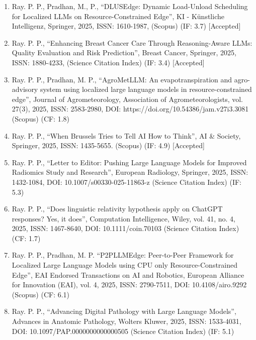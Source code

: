 \documentclass[11pt,a4paper]{moderncv}
\begin{document}
\begin{adjustwidth}{6em}{0pt}
	\begin{enumerate}
		
		
		\item Ray. P. P., Pradhan, M., P., “DLUSEdge: Dynamic Load-Unload Scheduling for Localized LLMs on Resource-Constrained Edge”, KI - Künstliche Intelligenz, Springer, 2025, ISSN: 1610-1987, (Scopus) (IF: 3.7) [Accepted]
		
		\item Ray. P. P., “Enhancing Breast Cancer Care Through Reasoning-Aware LLMs: Quality Evaluation and Risk Prediction”, Breast Cancer, Springer, 2025, ISSN: 1880-4233, (Science Citation Index) (IF: 3.4) [Accepted]
				
		\item Ray. P. P., Pradhan, M. P., “AgroMetLLM: An evapotranspiration and agro-advisory system using localized large language models in resource-constrained edge”, Journal of Agrometeorology, Association of Agrometeorologists, vol. 27(3), 2025, ISSN: 2583-2980, DOI: https://doi.org/10.54386/jam.v27i3.3081 (Scopus) (CF: 1.8)
		
		\item Ray. P. P., “When Brussels Tries to Tell AI How to Think”, AI \& Society, Springer, 2025, ISSN: 1435-5655. (Scopus) (IF: 4.9) [Accepted]
		
		\item Ray. P. P., “Letter to Editor: Pushing Large Language Models for Improved Radiomics Study and Research”, European Radiology, Springer, 2025, ISSN: 1432-1084, DOI: 10.1007/s00330-025-11863-z (Science Citation Index) (IF: 5.3)
		
		\item Ray. P. P., “Does linguistic relativity hypothesis apply on ChatGPT responses? Yes, it does”, Computation Intelligence, Wiley, vol. 41, no. 4, 2025, ISSN: 1467-8640, DOI: 10.1111/coin.70103 (Science Citation Index) (CF: 1.7)
		
		\item Ray. P. P., Pradhan, M. P. “P2PLLMEdge: Peer-to-Peer Framework for Localized Large Language Models using CPU only Resource-Constrained Edge”, EAI Endorsed Transactions on AI and Robotics, European Alliance for Innovation (EAI), vol. 4, 2025, ISSN: 2790-7511, DOI: 10.4108/airo.9292 (Scopus) (CF: 6.1)
		
		\item Ray. P. P., “Advancing Digital Pathology with Large Language Models”, Advances in Anatomic Pathology, Wolters Kluwer, 2025, ISSN: 1533-4031, DOI: 10.1097/PAP.0000000000000505 (Science Citation Index) (IF: 5.1)
		

\end{enumerate}
\end{adjustwidth}
\end{document}
